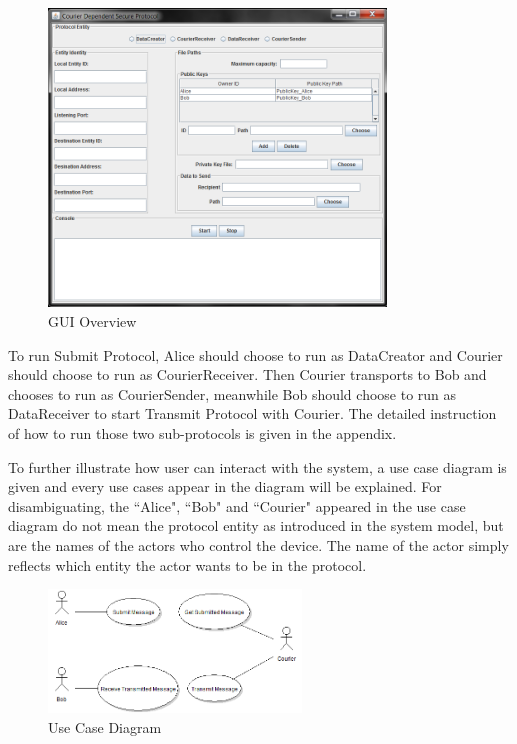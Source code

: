 \begin{figure}[h!]
\centering
\includegraphics[width=0.8\textwidth,natwidth=818,natheight=722]{figures/guiall.png}
\caption{GUI Overview}
\end{figure}

To run Submit Protocol, Alice should choose to run as DataCreator and Courier should choose to run as CourierReceiver. Then Courier transports to Bob and chooses to run as CourierSender, meanwhile Bob should choose to run as DataReceiver to start Transmit Protocol with Courier. The detailed instruction of how to run those two sub-protocols is given in the appendix. \par

To further illustrate how user can interact with the system, a use case diagram is given and every use cases appear in the diagram will be explained. For disambiguating, the ``Alice", ``Bob" and ``Courier" appeared in the use case diagram do not mean the protocol entity as introduced in the system model, but are the names of the actors who control the device. The name of the actor simply reflects which entity the actor wants to be in the protocol. \\

\begin{figure}[h!]
\centering
\includegraphics[width=0.6\textwidth,natwidth=565,natheight=275]{figures/usecasediagram.png}
\caption{Use Case Diagram}
\end{figure}

